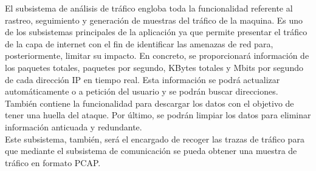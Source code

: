 El subsistema de análisis de tráfico engloba toda la funcionalidad referente al rastreo, seguimiento y generación de muestras del tráfico de la maquina. Es uno de los subsistemas principales de la aplicación ya que permite presentar el tráfico de la capa de internet con el fin de identificar las amenazas de red para, posteriormente, limitar su impacto.
En concreto, se proporcionará información de los paquetes totales, paquetes por segundo, KBytes totales y Mbits por segundo de cada dirección IP en tiempo real. Esta información se podrá actualizar automáticamente o a petición del usuario y se podrán buscar direcciones.
También contiene la funcionalidad para descargar los datos con el objetivo de tener una huella del ataque. Por último, se podrán limpiar los datos para eliminar información anticuada y redundante.
\\Este subsistema, también, será el encargado de recoger las trazas de tráfico para que mediante el subsistema de comunicación se pueda obtener una muestra de tráfico en formato PCAP.